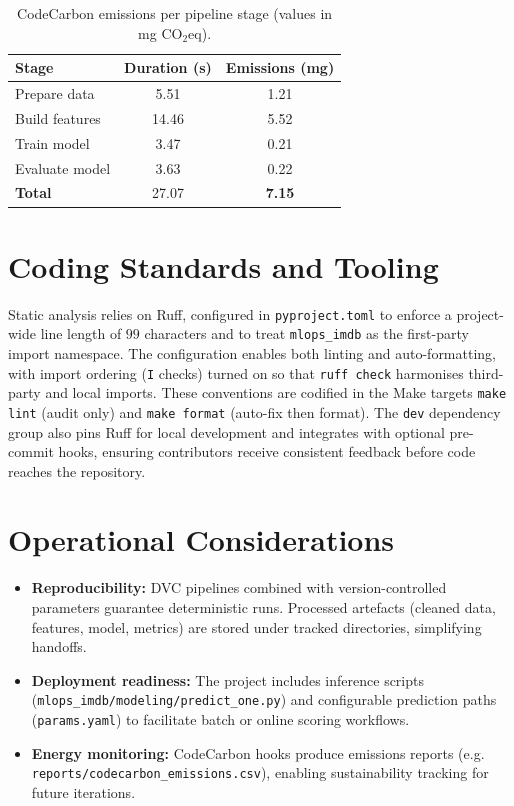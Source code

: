 \documentclass[11pt,a4paper]{article}
\begin{document}
\begin{table}[h]
  \centering
  \caption{CodeCarbon emissions per pipeline stage (values in mg CO\(_2\)eq).}
  \label{tab:carbon}
  \begin{tabular}{lcc}
    \toprule
    Stage & Duration (s) & Emissions (mg) \\
    \midrule
    Prepare data & 5.51 & 1.21 \\
    Build features & 14.46 & 5.52 \\
    Train model & 3.47 & 0.21 \\
    Evaluate model & 3.63 & 0.22 \\
    \midrule
    \textbf{Total} & 27.07 & \textbf{7.15} \\
    \bottomrule
  \end{tabular}
\end{table}

\section{Coding Standards and Tooling}
Static analysis relies on Ruff, configured in \texttt{pyproject.toml} to enforce a project-wide line length of \(99\) characters and to treat \texttt{mlops\_imdb} as the first-party import namespace. The configuration enables both linting and auto-formatting, with import ordering (\texttt{I} checks) turned on so that \texttt{ruff check} harmonises third-party and local imports. These conventions are codified in the Make targets \texttt{make lint} (audit only) and \texttt{make format} (auto-fix then format). The \texttt{dev} dependency group also pins Ruff for local development and integrates with optional pre-commit hooks, ensuring contributors receive consistent feedback before code reaches the repository.

\section{Operational Considerations}
\begin{itemize}[leftmargin=*]
  \item \textbf{Reproducibility:} DVC pipelines combined with version-controlled parameters guarantee deterministic runs. Processed artefacts (cleaned data, features, model, metrics) are stored under tracked directories, simplifying handoffs.
  \item \textbf{Deployment readiness:} The project includes inference scripts (\texttt{mlops\_imdb/modeling/predict\_one.py}) and configurable prediction paths (\texttt{params.yaml}) to facilitate batch or online scoring workflows.
  \item \textbf{Energy monitoring:} CodeCarbon hooks produce emissions reports (e.g. \texttt{reports/codecarbon\_emissions.csv}), enabling sustainability tracking for future iterations.
\end{itemize}
\end{document}
